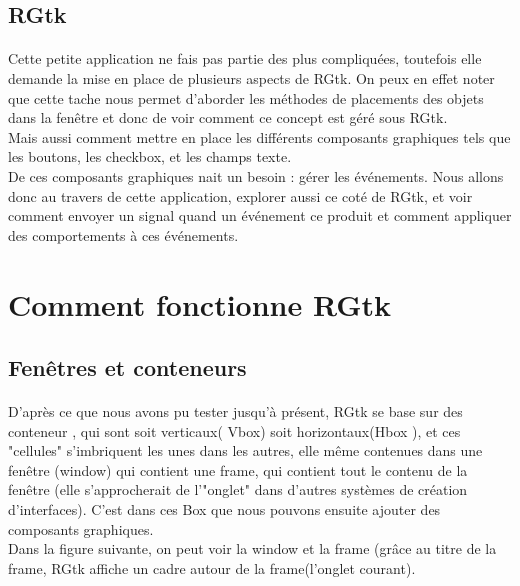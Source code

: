 \documentclass{article}
\begin{document}
\subsection{RGtk}
\paragraph{} 
Cette petite application ne fais pas partie des plus compliquées, toutefois elle demande la mise en place de plusieurs aspects de RGtk. On peux en effet noter que cette tache nous permet d'aborder les méthodes de placements des objets dans la fenêtre et donc de voir comment ce concept est géré sous RGtk.\\
Mais aussi comment mettre en place les différents composants graphiques tels que les boutons, les checkbox, et les champs texte.\\
De ces composants graphiques nait un besoin : gérer les événements. Nous allons donc au travers de cette application, explorer aussi ce coté de RGtk, et voir comment envoyer un signal quand un événement ce produit et comment appliquer des comportements à ces événements.\\

\newpage

\section{Comment fonctionne RGtk}
\subsection{Fenêtres et conteneurs}
\paragraph{} 
D'après ce que nous avons pu tester jusqu'à présent, RGtk se base sur des conteneur , qui sont soit verticaux( Vbox) soit horizontaux(Hbox ), et ces "cellules" s'imbriquent les unes dans les autres, elle même contenues dans une fenêtre (window) qui contient une frame, qui contient tout le contenu de la fenêtre (elle s’approcherait de l'"onglet" dans d'autres systèmes de création d'interfaces). C'est dans ces Box que nous pouvons ensuite ajouter des composants graphiques.\\

Dans la figure suivante, on peut voir la window et la frame (grâce au titre de la frame, RGtk affiche un cadre autour de la frame(l'onglet courant).\\
\end{document}
